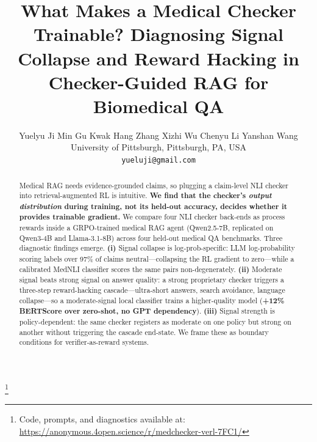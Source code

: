 \documentclass[11pt]{article}
\title{What Makes a Medical Checker Trainable?
Diagnosing Signal Collapse and Reward Hacking in
Checker-Guided RAG for Biomedical QA}
\author{
  Yuelyu Ji \quad Min Gu Kwak \quad Hang Zhang \quad Xizhi Wu \quad Chenyu Li \quad Yanshan Wang \\
  University of Pittsburgh, Pittsburgh, PA, USA \\
  \texttt{yueluji@gmail.com}
}
\newcommand\blfootnote[1]{%
  \begingroup\renewcommand\thefootnote{}\footnote{#1}%
  \addtocounter{footnote}{-1}\endgroup}
\begin{document}
\maketitle
\blfootnote{Code, prompts, and diagnostics available at: 
\url{https://anonymous.4open.science/r/medchecker-verl-7FC1/}}
\begin{abstract}
Medical RAG needs evidence-grounded claims, so 
plugging a claim-level NLI checker into 
retrieval-augmented RL is intuitive. \textbf{We find 
that the checker's \emph{output distribution} during 
training, not its held-out accuracy, decides whether 
it provides trainable gradient.} We compare four NLI 
checker back-ends as process rewards inside a 
GRPO-trained medical RAG agent (Qwen2.5-7B, 
replicated on Qwen3-4B and Llama-3.1-8B) across four 
held-out medical QA benchmarks. Three diagnostic 
findings emerge. \textbf{(i)} Signal collapse is 
log-prob-specific: LLM log-probability scoring labels 
over 97\% of claims neutral---collapsing the RL 
gradient to zero---while a calibrated MedNLI 
classifier scores the same pairs non-degenerately. 
\textbf{(ii)} Moderate signal beats strong signal on 
answer quality: a strong proprietary checker triggers 
a three-step reward-hacking cascade---ultra-short 
answers, search avoidance, language collapse---so a 
moderate-signal local classifier trains a 
higher-quality model (\textbf{+12\% BERTScore over 
zero-shot, no GPT dependency}). \textbf{(iii)} Signal 
strength is policy-dependent: the same checker 
registers as moderate on one policy but strong on 
another without triggering the cascade end-state. We 
frame these as boundary conditions for 
verifier-as-reward systems.
\end{abstract}
\end{document}
